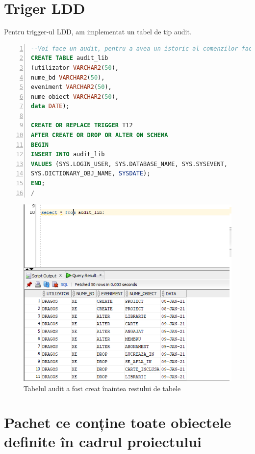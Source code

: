 \documentclass[12pt]{article}
\begin{document}
\section{Triger LDD}
Pentru trigger-ul LDD, am implementat un tabel de tip audit.\\
\begin{lstlisting}[language=SQL,
	showspaces=false,
	basicstyle=\ttfamily,
	numbers=left,
	numberstyle=\tiny,
	breaklines=true,
	commentstyle=\color{gray}]
--Voi face un audit, pentru a avea un istoric al comenzilor facute pe baza de date.
CREATE TABLE audit_lib
(utilizator VARCHAR2(50),
nume_bd VARCHAR2(50),
eveniment VARCHAR2(50),
nume_obiect VARCHAR2(50),
data DATE);

CREATE OR REPLACE TRIGGER T12
AFTER CREATE OR DROP OR ALTER ON SCHEMA
BEGIN
INSERT INTO audit_lib
VALUES (SYS.LOGIN_USER, SYS.DATABASE_NAME, SYS.SYSEVENT,
SYS.DICTIONARY_OBJ_NAME, SYSDATE);
END;
/
\end{lstlisting}	
\begin{figure}[!htb]
\includegraphics[max width=\linewidth]{imgs/ex12.png}
\caption{Tabelul audit a fost creat înaintea restului de tabele}
\label{fig:ex12}
\end{figure}
\section{Pachet ce conține toate obiectele definite în cadrul proiectului}
\end{document}
